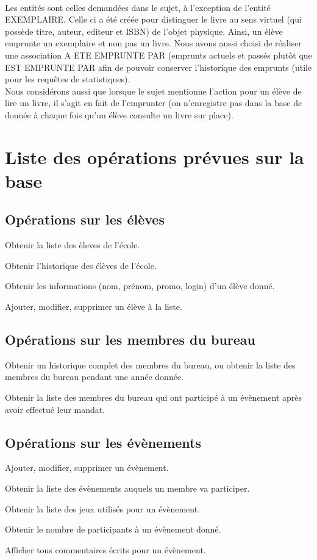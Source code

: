 \documentclass[a4paper, 11pt]{article}
\begin{document}
\paragraph{}
Les entités sont celles demandées dans le sujet, à l'exception de l'entité EXEMPLAIRE. Celle ci a été créée pour distinguer le livre au sens virtuel (qui possède titre, auteur, editeur et ISBN) de l'objet physique. Ainsi, un élève emprunte un exemplaire et non pas un livre. Nous avons aussi choisi de réaliser une association A ETE EMPRUNTE PAR (emprunts actuels et passés plut\^ot que EST EMPRUNTE PAR afin de pouvoir conserver l'historique des emprunts (utile pour les requ\^etes de statistiques).\\
Nous considérons aussi que lorsque le sujet mentionne l'action pour un élève de lire un livre, il s'agit en fait de l'emprunter (on n'enregistre pas dans la base de donnée à chaque fois qu'un élève consulte un livre sur place). 
\section{Liste des opérations prévues sur la base}

\subsection{Opérations sur les élèves}
\item Obtenir la liste des èleves de l'école.
\item Obtenir l'historique des élèves de l'école.
\item Obtenir les informations (nom, prénom, promo, login) d'un élève donné.
\item Ajouter, modifier, supprimer un élève à la liste.
\subsection{Opérations sur les membres du bureau}
\item Obtenir un historique complet des membres du bureau, ou obtenir la liste des membres du bureau pendant une année donnée.
\item Obtenir la liste des membres du bureau qui ont participé à un évènement après avoir effectué leur mandat.
\subsection{Opérations sur les évènements}
\item Ajouter, modifier, supprimer un évènement.
\item Obtenir la liste des évènements auquels un membre va participer.
\item Obtenir la liste des jeux utilisés pour un évènement.
\item Obtenir le nombre de participants à un évènement donné.
\item Afficher tous commentaires écrits pour un évènement.
\end{document}
